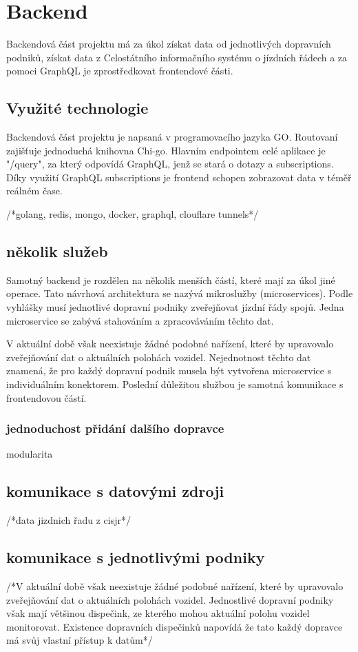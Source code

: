 
\section{Backend}
Backendová část projektu má za úkol získat data od jednotlivých dopravních podniků, získat data z Celostátního informačního systému o jízdních řádech\cite{cisjr} a za pomoci GraphQL je zprostředkovat frontendové části.
\subsection{Využité technologie}
Backendová část projektu je napsaná v programovacího jazyka GO. Routovaní zajišťuje jednoduchá knihovna Chi-go. Hlavním endpointem celé aplikace je "/query", za který odpovídá GraphQL, jenž se stará o dotazy a subscriptions. Díky využití GraphQL subscriptions je frontend schopen zobrazovat data v téměř reálném čase.\par

/*golang, redis, mongo, docker, graphql, clouflare tunnels*/
\subsection{několik služeb}
Samotný backend je rozdělen na několik menších částí, které mají za úkol jiné operace. Tato návrhová architektura se nazývá mikroslužby (microservices). Podle vyhlášky\cite{vyhlaskaJizdniRady} musí jednotlivé dopravní podniky zveřejňovat jízdní řády spojů. Jedna microservice se zabývá stahováním a zpracováváním těchto dat. \par
V aktuální době však neexistuje žádné podobné nařízení, které by upravovalo zveřejňování dat o aktuálních polohách vozidel. Nejednotnost těchto dat znamená, že pro každý dopravní podnik musela být vytvořena microservice s individuálním konektorem. Poslední důležitou službou je samotná komunikace s frontendovou částí.
\subsubsection{jednoduchost přidání dalšího dopravce}
modularita
\subsection {komunikace s datovými zdroji}
/*data jizdnich řadu z cisjr*/
\subsection {komunikace s jednotlivými podniky}
/*V aktuální době však neexistuje žádné podobné nařízení, které by upravovalo zveřejňování dat o aktuálních polohách vozidel. Jednostlivé dopravní podniky však mají většinou dispečink, ze kterého mohou aktuální polohu vozidel monitorovat. Existence dopravních dispečinků napovídá že tato
každý dopravce má svůj vlastní přístup k datům*/
